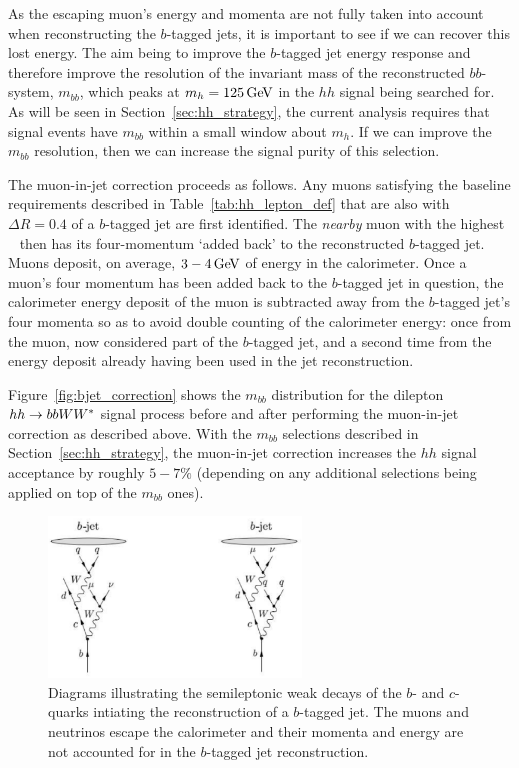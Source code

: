 As the escaping muon's energy and momenta are not fully taken into account when reconstructing the $b$-tagged jets,
it is important to see if we can recover this lost energy.
The aim being to improve the $b$-tagged jet energy response and therefore improve the resolution of the invariant
mass of the reconstructed $bb$-system, $m_{bb}$, which peaks at $m_{h} = 125\,\text{Ge\kern -0.1em V}$ in the $hh$ signal
being searched for.
As will be seen in Section~\ref{sec:hh_strategy}, the current analysis requires that signal events
have $m_{bb}$ within a small window about $m_{h}$.
If we can improve the $m_{bb}$ resolution, then we can increase the signal purity of this selection.

The muon-in-jet correction proceeds as follows.
Any muons satisfying the baseline requirements described in Table~\ref{tab:hh_lepton_def} that
are also with $\Delta R = 0.4$ of a $b$-tagged jet are first identified.
The \textit{nearby} muon with the highest \pT~ then has its four-momentum `added back' to the reconstructed
$b$-tagged jet.
Muons deposit, on average, $3-4\,\text{Ge\kern -0.1em V}$ of energy in the calorimeter.
Once a muon's four momentum has been added back to the $b$-tagged jet in question, the calorimeter
energy deposit of the muon is subtracted away from the $b$-tagged jet's four momenta so as to avoid double
counting of the calorimeter energy: once from the muon, now considered part of the $b$-tagged jet, and a
second time from the energy deposit already having been used in the jet reconstruction.

Figure~\ref{fig:bjet_correction} shows the $m_{bb}$ distribution for the dilepton
$hh \rightarrow bbWW^*$ signal process before and after performing the muon-in-jet correction
as described above.
With the $m_{bb}$ selections described in Section~\ref{sec:hh_strategy}, the muon-in-jet
correction increases the $hh$ signal acceptance by roughly $5-7\%$ (depending on any additional
selections being applied on top of the $m_{bb}$ ones).

\begin{figure}[!htb]
    \begin{center}
        \includegraphics[width=0.6\textwidth]{figures/search_hh/bjet_semileptonic}
        \caption{
            Diagrams illustrating the semileptonic weak decays of the $b$- and $c$-quarks intiating the reconstruction
                of a $b$-tagged jet.
                The muons and neutrinos escape the calorimeter and their momenta and energy are not accounted
                for in the $b$-tagged jet reconstruction.
        }
        \label{fig:bjet_semileptonic}
    \end{center}
\end{figure}

